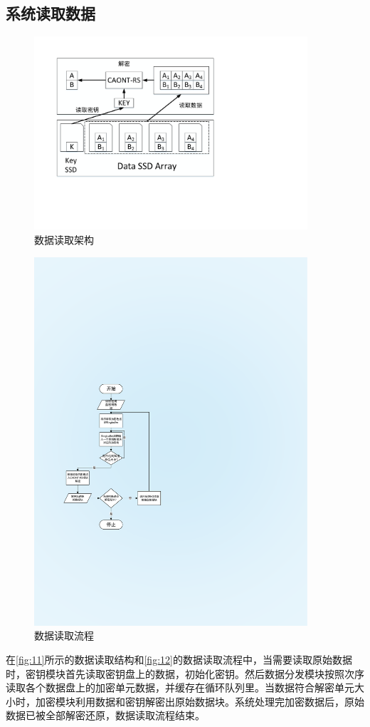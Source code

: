 \subsection{系统读取数据}
\begin{figure}[H]
	\centering
	\includegraphics[width=4in]{Pics/data-read-st.pdf}
	\caption{数据读取架构}
    \label{fig:11}
\end{figure}
\begin{figure}[H]
	\centering
	\includegraphics[width=4in]{Pics/data-read-pr.pdf}
	\caption{数据读取流程}
    \label{fig:12}
\end{figure}
在\autoref{fig:11}所示的数据读取结构和\autoref{fig:12}的数据读取流程中，当需要读取原始数据时，密钥模块首先读取密钥盘上的数据，初始化密钥。然后数据分发模块按照次序读取各个数据盘上的加密单元数据，并缓存在循环队列里。当数据符合解密单元大小时，加密模块利用数据和密钥解密出原始数据块。系统处理完加密数据后，原始数据已被全部解密还原，数据读取流程结束。

